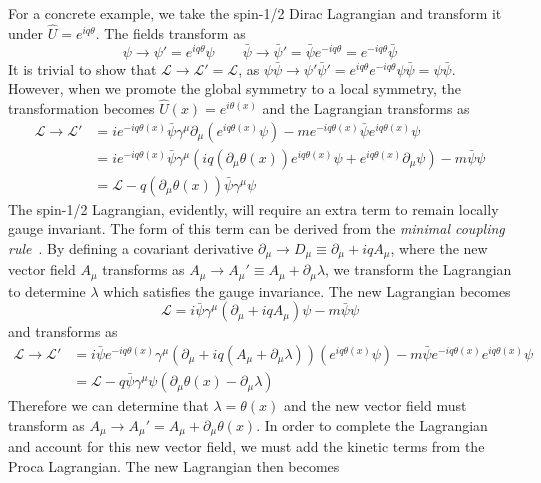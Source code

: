 For a concrete example, we take the spin-1/2 Dirac Lagrangian and transform it under $\hat{U}=e^{iq\theta}$. The fields transform as
\begin{equation}
	\psi\to\psi'=e^{iq\theta}\psi \qquad \bar{\psi}\to\bar{\psi}'= \bar{\psi}e^{-iq\theta} =e^{-iq\theta}\bar{\psi}
\end{equation}
It is trivial to show that $\mathcal{L}\to\mathcal{L}'=\mathcal{L}$, as $\psi\bar{\psi}\to\psi'\bar{\psi}'=e^{iq\theta}e^{-iq\theta}\psi\bar{\psi}=\psi\bar{\psi}$. However, when we promote the global symmetry to a local symmetry, the transformation becomes $\hat{U}(x)=e^{i\theta(x)}$ and the Lagrangian transforms as
\begin{align}
	\mathcal{L}\to\mathcal{L}'&=ie^{-iq\theta(x)}\bar{\psi}\gamma^\mu\partial_\mu(e^{iq\theta(x)}\psi)-me^{-iq\theta(x)}\bar{\psi}e^{iq\theta(x)}\psi\\
	&=ie^{-iq\theta(x)}\bar{\psi}\gamma^\mu\left(iq(\partial_\mu\theta(x))e^{iq\theta(x)}\psi+e^{iq\theta(x)}\partial_\mu\psi\right)-m\bar{\psi}\psi\\
	&=\mathcal{L}-q(\partial_\mu\theta(x))\bar{\psi}\gamma^\mu\psi
\end{align}
The spin-1/2 Lagrangian, evidently, will require an extra term to remain locally gauge invariant. The form of this term can be derived from the \textit{minimal coupling rule}~\cite{griffiths_gauge}. By defining a covariant derivative $\partial_\mu\to D_\mu\equiv\partial_\mu+iqA_\mu$, where the new vector field $A_\mu$ transforms as $A_\mu\to A_\mu'\equiv A_\mu+\partial_\mu\lambda$, we transform the Lagrangian to determine $\lambda$ which satisfies the gauge invariance. The new Lagrangian becomes \begin{equation}
	\mathcal{L}=i\bar{\psi}\gamma^\mu\left(\partial_\mu+iqA_\mu\right)\psi-m\bar{\psi}\psi
\end{equation}
and transforms as
\begin{align}
	\mathcal{L}\to\mathcal{L}'&=i\bar{\psi}e^{-iq\theta(x)}\gamma^\mu\left(\partial_\mu+iq(A_\mu+\partial_\mu\lambda)\right)(e^{iq\theta(x)}\psi)-m\bar{\psi}e^{-iq\theta(x)}e^{iq\theta(x)}\psi\\
	&=\mathcal{L}-q\bar{\psi}\gamma^\mu\psi\left(\partial_\mu\theta(x)-\partial_\mu\lambda\right)
\end{align}
Therefore we can determine that $\lambda=\theta(x)$ and the new vector field must transform as $A_\mu\to A_\mu'=A_\mu+\partial_\mu\theta(x)$. In order to complete the Lagrangian and account for this new vector field, we must add the kinetic terms from the Proca Lagrangian. The new Lagrangian then becomes
